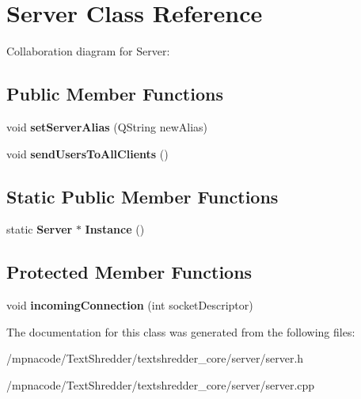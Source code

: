 \section{Server Class Reference}
\label{class_server}


Collaboration diagram for Server:
\subsection*{Public Member Functions}
\begin{DoxyCompactItemize}
\item 
void {\bfseries setServerAlias} (QString newAlias)\label{class_server_af6867f3b0e768ecdfa4cca2755a6a60b}

\item 
void {\bfseries sendUsersToAllClients} ()\label{class_server_a55398b8dffc88e16f03be9afe72d8b09}

\end{DoxyCompactItemize}
\subsection*{Static Public Member Functions}
\begin{DoxyCompactItemize}
\item 
static {\bf Server} $\ast$ {\bfseries Instance} ()\label{class_server_a319f8da4a27ca0b79f37c3d741336464}

\end{DoxyCompactItemize}
\subsection*{Protected Member Functions}
\begin{DoxyCompactItemize}
\item 
void {\bfseries incomingConnection} (int socketDescriptor)\label{class_server_a48091e8b382412a1f63f05f4cc0ad599}

\end{DoxyCompactItemize}


The documentation for this class was generated from the following files:\begin{DoxyCompactItemize}
\item 
/mpnacode/TextShredder/textshredder\_\-core/server/server.h\item 
/mpnacode/TextShredder/textshredder\_\-core/server/server.cpp\end{DoxyCompactItemize}
